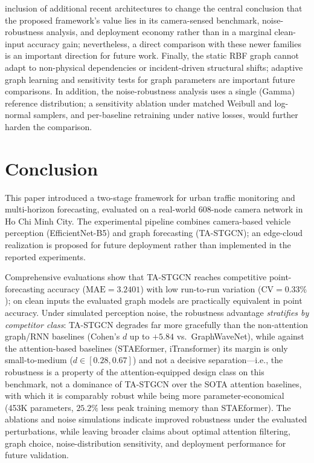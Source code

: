 \documentclass[journal,twocolumn]{IEEEtran}
\begin{document}
inclusion of additional recent architectures to change the central conclusion that the proposed framework's value lies in its camera-sensed benchmark, noise-robustness analysis, and deployment economy rather than in a marginal clean-input accuracy gain; nevertheless, a direct comparison with these newer families is an important direction for future work. Finally, the static RBF graph cannot adapt to non-physical dependencies or incident-driven structural shifts; adaptive graph learning and sensitivity tests for graph parameters are important future comparisons. In addition, the noise-robustness analysis uses a single (Gamma) reference distribution; a sensitivity ablation under matched Weibull and log-normal samplers, and per-baseline retraining under native losses, would further harden the comparison.

\section{Conclusion}
\label{sec:conclusion}

This paper introduced a two-stage framework for urban traffic monitoring and multi-horizon forecasting, evaluated on a real-world 608-node camera network in Ho Chi Minh City. The experimental pipeline combines camera-based vehicle perception (EfficientNet-B5) and graph forecasting (TA-STGCN); an edge-cloud realization is proposed for future deployment rather than implemented in the reported experiments.

Comprehensive evaluations show that TA-STGCN reaches competitive point-forecasting accuracy ($\text{MAE} = \mathbf{3.2401}$) with low run-to-run variation ($\text{CV}=0.33\%$); on clean inputs the evaluated graph models are practically equivalent in point accuracy. Under simulated perception noise, the robustness advantage \emph{stratifies by competitor class}: TA-STGCN degrades far more gracefully than the non-attention graph/RNN baselines (Cohen's $d$ up to $+5.84$ vs.\ GraphWaveNet), while against the attention-based baselines (STAEformer, iTransformer) its margin is only small-to-medium ($d \in [0.28, 0.67]$) and not a decisive separation---i.e., the robustness is a property of the attention-equipped design class on this benchmark, not a dominance of TA-STGCN over the SOTA attention baselines, with which it is comparably robust while being more parameter-economical (453K parameters, $25.2\%$ less peak training memory than STAEformer). The ablations and noise simulations indicate improved robustness under the evaluated perturbations, while leaving broader claims about optimal attention filtering, graph choice, noise-distribution sensitivity, and deployment performance for future validation.
\end{document}
